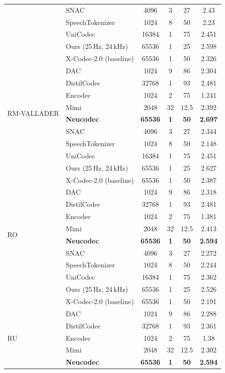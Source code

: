 \documentclass[preprint]{article}
\begin{document}
\begin{longtable}{llcccc}
  & SNAC & 4096 & 3 & 27 & 2.43 \\
  & SpeechTokenizer & 1024 & 8 & 50 & 2.23 \\
  & UniCodec & 16384 & 1 & 75 & 2.451 \\
  & Ours (25\,Hz, 24\,kHz) & 65536 & 1 & 25 & 2.598 \\
  & X-Codec-2.0 (baseline) & 65536 & 1 & 50 & 2.326 \\
\midrule
\multirow{8}{*}{RM-VALLADER}
  & DAC & 1024 & 9 & 86 & 2.304 \\
  & DistilCodec & 32768 & 1 & 93 & 2.481 \\
  & Encodec & 1024 & 2 & 75 & 1.241 \\
  & Mimi & 2048 & 32 & 12.5 & 2.392 \\
  & \textbf{Neucodec} & \textbf{65536} & \textbf{1} & \textbf{50} & \textbf{2.697} \\
  & SNAC & 4096 & 3 & 27 & 2.344 \\
  & SpeechTokenizer & 1024 & 8 & 50 & 2.148 \\
  & UniCodec & 16384 & 1 & 75 & 2.451 \\
  & Ours (25\,Hz, 24\,kHz) & 65536 & 1 & 25 & 2.627 \\
  & X-Codec-2.0 (baseline) & 65536 & 1 & 50 & 2.387 \\
\midrule
\multirow{8}{*}{RO}
  & DAC & 1024 & 9 & 86 & 2.318 \\
  & DistilCodec & 32768 & 1 & 93 & 2.481 \\
  & Encodec & 1024 & 2 & 75 & 1.381 \\
  & Mimi & 2048 & 32 & 12.5 & 2.413 \\
  & \textbf{Neucodec} & \textbf{65536} & \textbf{1} & \textbf{50} & \textbf{2.594} \\
  & SNAC & 4096 & 3 & 27 & 2.272 \\
  & SpeechTokenizer & 1024 & 8 & 50 & 2.244 \\
  & UniCodec & 16384 & 1 & 75 & 2.362 \\
  & Ours (25\,Hz, 24\,kHz) & 65536 & 1 & 25 & 2.526 \\
  & X-Codec-2.0 (baseline) & 65536 & 1 & 50 & 2.191 \\
\midrule
\multirow{8}{*}{RU}
  & DAC & 1024 & 9 & 86 & 2.288 \\
  & DistilCodec & 32768 & 1 & 93 & 2.361 \\
  & Encodec & 1024 & 2 & 75 & 1.38 \\
  & Mimi & 2048 & 32 & 12.5 & 2.302 \\
  & \textbf{Neucodec} & \textbf{65536} & \textbf{1} & \textbf{50} & \textbf{2.594} \\

\end{longtable}
\end{document}
